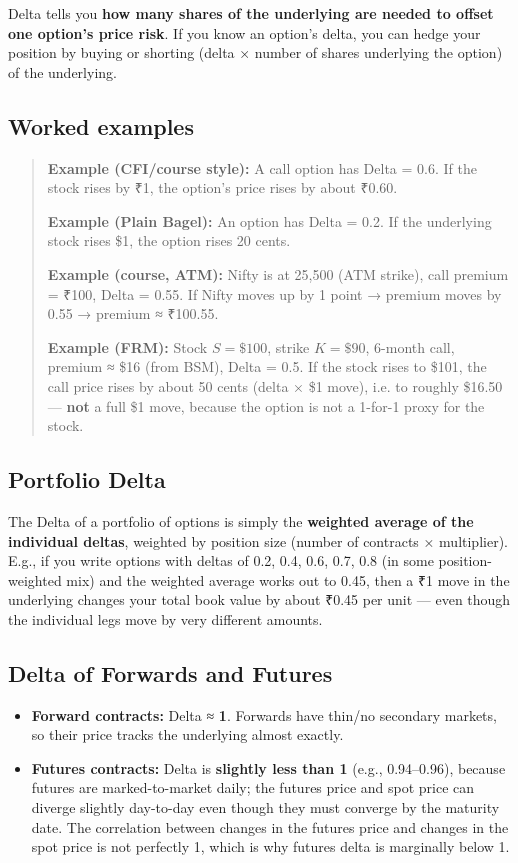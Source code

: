 \documentclass[12pt,openany]{book}
\theoremstyle{definition}
\theoremstyle{remark}
\begin{document}
Delta tells you \textbf{how many shares of the underlying are needed to offset one option's price risk}. If you know an option's delta, you can hedge your position by buying or shorting (delta × number of shares underlying the option) of the underlying.

\subsection{Worked examples}

\begin{quote}
\textbf{Example (CFI/course style):} A call option has Delta = 0.6. If the stock rises by ₹1, the option's price rises by about ₹0.60.

\textbf{Example (Plain Bagel):} An option has Delta = 0.2. If the underlying stock rises \$1, the option rises 20 cents.

\textbf{Example (course, ATM):} Nifty is at 25,500 (ATM strike), call premium = ₹100, Delta = 0.55.
If Nifty moves up by 1 point → premium moves by 0.55 → premium ≈ ₹100.55.

\textbf{Example (FRM):} Stock \(S=\$100\), strike \(K=\$90\), 6-month call, premium ≈ \$16 (from BSM), Delta = 0.5.
If the stock rises to \$101, the call price rises by about 50 cents (delta × \$1 move), i.e. to roughly \$16.50 — \textbf{not} a full \$1 move, because the option is not a 1-for-1 proxy for the stock.
\end{quote}

\subsection{Portfolio Delta}

The Delta of a portfolio of options is simply the \textbf{weighted average of the individual deltas}, weighted by position size (number of contracts × multiplier). E.g., if you write options with deltas of 0.2, 0.4, 0.6, 0.7, 0.8 (in some position-weighted mix) and the weighted average works out to 0.45, then a ₹1 move in the underlying changes your total book value by about ₹0.45 per unit — even though the individual legs move by very different amounts.

\subsection{Delta of Forwards and Futures}

\begin{itemize}
\item \textbf{Forward contracts:} Delta ≈ \textbf{1}. Forwards have thin/no secondary markets, so their price tracks the underlying almost exactly.
\item \textbf{Futures contracts:} Delta is \textbf{slightly less than 1} (e.g., 0.94–0.96), because futures are marked-to-market daily; the futures price and spot price can diverge slightly day-to-day even though they must converge by the maturity date. The correlation between changes in the futures price and changes in the spot price is not perfectly 1, which is why futures delta is marginally below 1.
\end{itemize}
\end{document}
